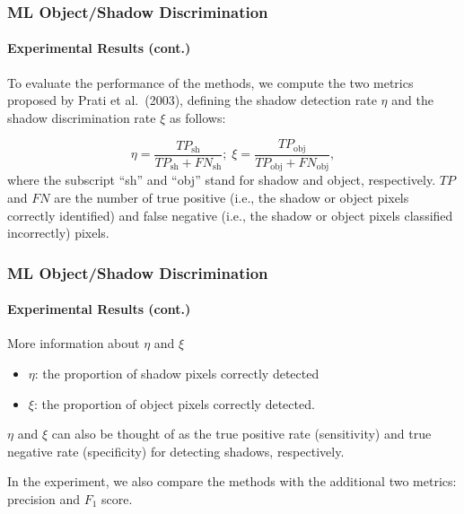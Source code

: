 
\begin{frame}
    \frametitle{ML Object/Shadow Discrimination}
    \framesubtitle{Experimental Results (cont.)}

    To evaluate the performance of the methods, we compute the two 
    metrics proposed by Prati et al.\ (2003), defining the shadow 
    detection rate $\eta$ and the shadow discrimination rate $\xi$ 
    as follows:

    \[
        \eta = \frac{TP_{\text{sh}}}{TP_{\text{sh}} + FN_{\text{sh}}};\; 
        \xi = \frac{TP_{\text{obj}}}{TP_{\text{obj}} + FN_{\text{obj}}},
    \]
    where the subscript ``sh'' and ``obj'' stand for shadow and object,
    respectively. $TP$ and $FN$ are the number of true positive (i.e., the
    shadow or object pixels correctly identified) and false negative
    (i.e., the shadow or object pixels classified incorrectly) pixels.

\end{frame}


\ifnum{}

\begin{frame}
    \frametitle{ML Object/Shadow Discrimination}
    \framesubtitle{Experimental Results (cont.)}

    More information about $\eta$ and $\xi$ 
    \begin{itemize}
        \item $\eta$: the proportion of shadow pixels 
            correctly detected
        \item $\xi$: the proportion of object pixels 
            correctly detected.  
    \end{itemize}  
    
    $\eta$ and $\xi$ can also be thought of as the true
    positive rate (sensitivity) and true negative rate (specificity) for
    detecting shadows, respectively. 
  
    \bigskip
  
    In the experiment, we also compare the methods with the additional 
    two metrics: precision and $F_1$ score.

\end{frame}

\fi


